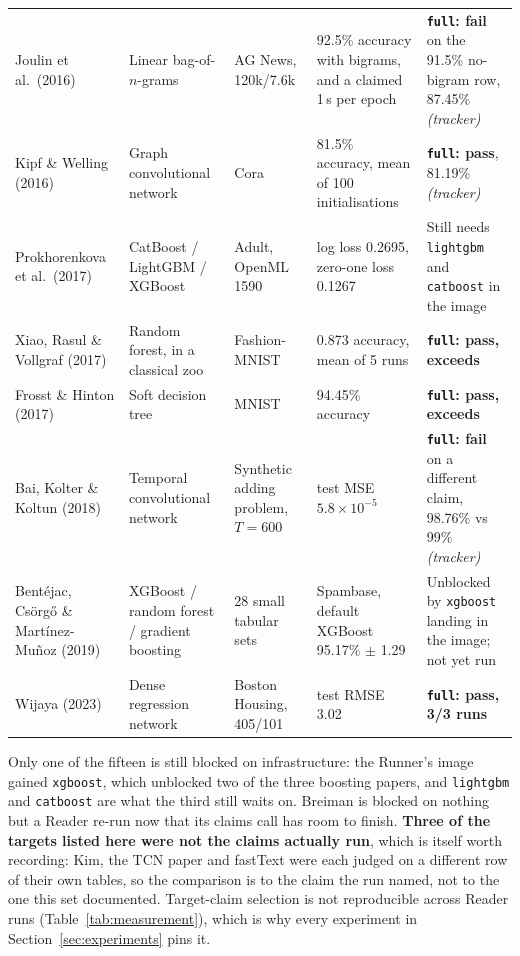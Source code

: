 \documentclass[10pt,twocolumn]{article}
\begin{document}
\begin{table}[tbp]
\begin{tabular}{L{0.165\textwidth}L{0.155\textwidth}L{0.145\textwidth}L{0.225\textwidth}L{0.165\textwidth}}
Joulin et al.\ (2016) \cite{joulin2016fasttext} & Linear bag-of-$n$-grams & AG News,
  120k/7.6k & 92.5\% accuracy with bigrams, and a claimed 1\,s per epoch &
  \textbf{\texttt{full}: fail} on the 91.5\% no-bigram row, 87.45\% \emph{(tracker)} \\
Kipf \& Welling (2016) \cite{kipf2017gcn} & Graph convolutional network & Cora & 81.5\% accuracy,
  mean of 100 initialisations & \textbf{\texttt{full}: pass}, 81.19\% \emph{(tracker)} \\
Prokhorenkova et al.\ (2017) \cite{prokhorenkova2018catboost} & CatBoost / LightGBM / XGBoost &
  Adult, OpenML 1590 & log loss 0.2695, zero-one loss 0.1267 & Still needs \texttt{lightgbm} and
  \texttt{catboost} in the image \\
Xiao, Rasul \& Vollgraf (2017) \cite{xiao2017fashion} & Random forest, in a classical zoo &
  Fashion-MNIST & 0.873 accuracy, mean of 5 runs & \textbf{\texttt{full}: pass, exceeds} \\
Frosst \& Hinton (2017) \cite{frosst2017soft} & Soft decision tree & MNIST & 94.45\% accuracy &
  \textbf{\texttt{full}: pass, exceeds} \\
Bai, Kolter \& Koltun (2018) \cite{bai2018tcn} & Temporal convolutional network & Synthetic adding
  problem, $T = 600$ & test MSE $5.8 \times 10^{-5}$ & \textbf{\texttt{full}: fail} on a different
  claim, 98.76\% vs 99\% \emph{(tracker)} \\
Bentéjac, Csörgő \& Martínez-Muñoz (2019) \cite{bentejac2021comparative} & XGBoost / random forest
  / gradient boosting & 28 small tabular sets & Spambase, default XGBoost 95.17\% $\pm$ 1.29 &
  Unblocked by \texttt{xgboost} landing in the image; not yet run \\
Wijaya (2023) \cite{wijaya2023housing} & Dense regression network & Boston Housing, 405/101 & test
  RMSE 3.02 & \textbf{\texttt{full}: pass, 3/3 runs} \\
\bottomrule
\end{tabular}
\end{table}

Only one of the fifteen is still blocked on infrastructure: the Runner's image gained
\texttt{xgboost}, which unblocked two of the three boosting papers, and \texttt{lightgbm} and
\texttt{catboost} are what the third still waits on. Breiman is blocked on nothing but a Reader
re-run now that its claims call has room to finish. \textbf{Three of the targets listed here were
not the claims actually run}, which is itself worth recording: Kim, the TCN paper and fastText
were each judged on a different row of their own tables, so the comparison is to the claim the
run named, not to the one this set documented. Target-claim selection is not reproducible across
Reader runs (Table~\ref{tab:measurement}), which is why every experiment in
Section~\ref{sec:experiments} pins it.
\end{document}
